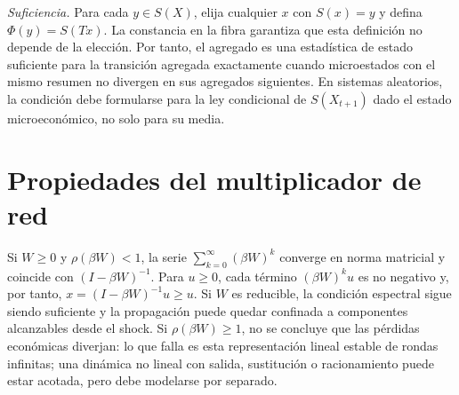 \documentclass[11pt,a4paper]{article}
\begin{document}
\emph{Suficiencia.} Para cada $y\in S(X)$, elija cualquier $x$ con $S(x)=y$ y defina $\Phi(y)=S(Tx)$. La constancia en la fibra garantiza que esta definición no depende de la elección. Por tanto, el agregado es una estadística de estado suficiente para la transición agregada exactamente cuando microestados con el mismo resumen no divergen en sus agregados siguientes. En sistemas aleatorios, la condición debe formularse para la ley condicional de $S(X_{t+1})$ dado el estado microeconómico, no solo para su media.

\section{Propiedades del multiplicador de red}
Si $W\geq0$ y $\rho(\beta W)<1$, la serie $\sum_{k=0}^{\infty}(\beta W)^k$ converge en norma matricial y coincide con $(I-\beta W)^{-1}$. Para $u\geq0$, cada término $(\beta W)^ku$ es no negativo y, por tanto, $x=(I-\beta W)^{-1}u\geq u$. Si $W$ es reducible, la condición espectral sigue siendo suficiente y la propagación puede quedar confinada a componentes alcanzables desde el shock. Si $\rho(\beta W)\geq1$, no se concluye que las pérdidas económicas diverjan: lo que falla es esta representación lineal estable de rondas infinitas; una dinámica no lineal con salida, sustitución o racionamiento puede estar acotada, pero debe modelarse por separado.
\end{document}

